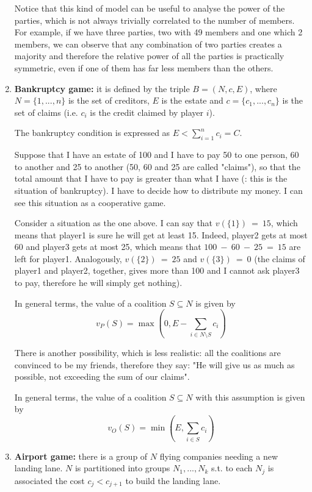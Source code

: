 \begin{enumerate}
	\noindent Notice that this kind of model can be useful to analyse the power 
	of the parties, which is not always trivially correlated to the number of 
	members. For example, if we have three parties, two with 49 members and one 
	which 2 members, we can observe that any combination of two parties creates 
	a majority and therefore the relative power of all the parties is practically 
	symmetric, even if one of them has far less members than the others.
	
	\item \textbf{Bankruptcy game:} it is defined by the triple $B = (N, c, E)$, where $N = \{1,...,n\}$ is the set of creditors, $E$ is the estate and $c = \{c_1,...,c_n\}$ is the set of claims (i.e. $c_i$ is the credit claimed by player $i$).
	
	\noindent The bankruptcy condition is expressed as $E < \sum_{i=1}^n{c_i} = C$.

	\noindent Suppose that I have an estate of 100 and I have to pay 50 to one 
	person, 60 to another and 25 to another (50, 60 and 25 are called "claims"), 
	so that the total amount that I 
	have to pay is greater than what I have (: this is the situation of 
	bankruptcy). I have to decide how to distribute my money. I can see this 
	situation as a cooperative game.
	
	\noindent Consider a situation as the one above. I can say that $v(\{1\})~=~15$, 
	which means that player1 is sure he will get at least 15. Indeed, player2 gets 
	at most 60 and player3 gets at most 25, which means that $100~-~60~-~25~=~15$ 
	are left for player1. Analogously, $v(\{2\})~=~25$ and $v(\{3\})~=~0$ (the claims 
	of player1 and player2, together, gives more than 100 and I cannot ask player3 
	to pay, therefore he will simply get nothing).
	
	\noindent In general terms, the value of a coalition $S \subseteq N$ is given by
	\[
		v_P(S) = \max\left(0, E - \sum_{i \in N \setminus S}{c_i}\right)
	\]
	
	\noindent There is another possibility, which is less realistic: all the 
	coalitions are convinced to be my friends, therefore they say: "He will give 
	us as much as possible, not exceeding the sum of our claims".

	\noindent In general terms, the value of a coalition $S \subseteq N$ with this assumption is given by
	\[
	v_O(S) = \min\left(E, \sum_{i \in  S}{c_i}\right)
	\]

	\item \textbf{Airport game:} there is a group of $N$ flying companies needing a new landing lane. $N$ is partitioned into groups $N_1,...,N_k$ s.t. to each $N_j$ is associated the cost $c_j < c_{j+1}$ to build the landing lane.


\end{enumerate}
